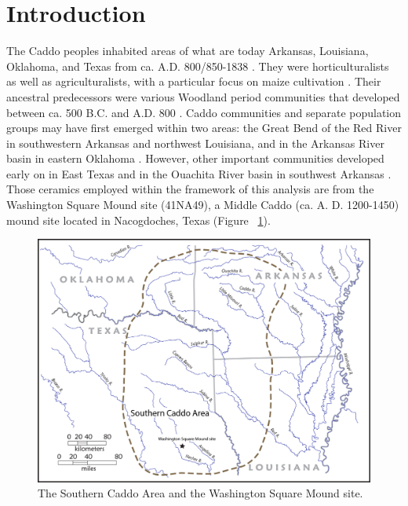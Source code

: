 \documentclass[preprint,12pt]{elsarticle}
\begin{document}
\linenumbers

\section{Introduction}
\label{S:1}

The Caddo peoples inhabited areas of what are today Arkansas, Louisiana, Oklahoma, and Texas from ca. A.D. 800/850-1838 \citep{Perttula:2}. They were horticulturalists as well as agriculturalists, with a particular focus on maize cultivation \citep{Perttula:2, Perttula:3, Wilson:1}. Their ancestral predecessors were various Woodland period communities that developed between ca. 500 B.C. and A.D. 800 \citep{Selden:8}. Caddo communities and separate population groups may have first emerged within two areas: the Great Bend of the Red River in southwestern Arkansas and northwest Louisiana, and in the Arkansas River basin in eastern Oklahoma \citep{Story:1}. However, other important communities developed early on in East Texas and in the Ouachita River basin in southwest Arkansas \citep{Story:1}. Those ceramics employed within the framework of this analysis are from the Washington Square Mound site (41NA49), a Middle Caddo (ca. A. D. 1200-1450) mound site located in Nacogdoches, Texas (Figure ~\ref{fig:Figure 1}).

\begin{figure}[ht]\centering
\includegraphics[width=\linewidth]{SS_2015_Figure_1}
\caption{The Southern Caddo Area and the Washington Square Mound site.}
\label{fig:Figure 1}
\end{figure}
\end{document}
